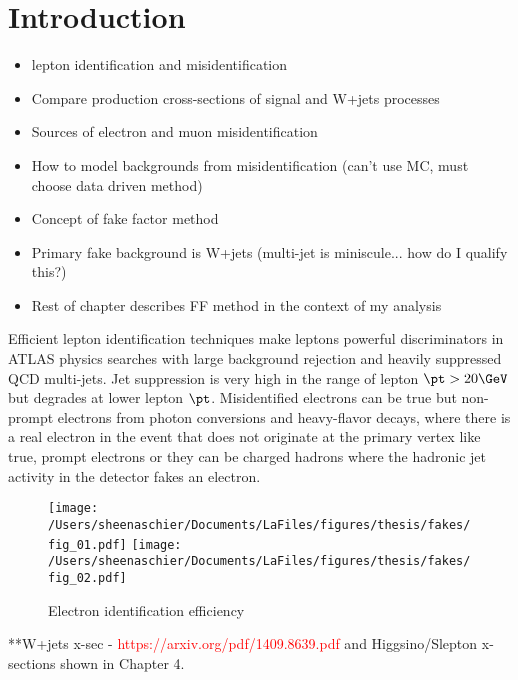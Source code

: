 \section{Introduction}
\label{sec:FFintro}
\begin{itemize}
\item lepton identification and misidentification
\item Compare production cross-sections of signal and W+jets processes
\item Sources of electron and muon misidentification
\item How to model backgrounds from misidentification (can't use MC, must choose data driven method)
\item Concept of fake factor method
\item Primary fake background is W+jets (multi-jet is miniscule...  how do I qualify this?)
\item Rest of chapter describes FF method in the context of my analysis
\end{itemize}
Efficient lepton identification techniques make leptons powerful discriminators in ATLAS physics searches with large background rejection and heavily suppressed QCD multi-jets.  Jet suppression is very high in the range of lepton $\pt > 20\GeV$ but degrades at lower lepton $\pt$.  Misidentified electrons can be true but non-prompt electrons from photon conversions and heavy-flavor decays, where there is a real electron in the event that does not originate at the primary vertex like true, prompt electrons or they can be charged hadrons where the  hadronic jet activity in the detector fakes an electron.  
\begin{figure}[h!]
 \centering
 \texttt{[image: /Users/sheenaschier/Documents/LaFiles/figures/thesis/fakes/fig\_01.pdf]}
  \texttt{[image: /Users/sheenaschier/Documents/LaFiles/figures/thesis/fakes/fig\_02.pdf]}
 \caption{Electron identification efficiency}
 \label{fig:electronID}
 \end{figure}

**W+jets x-sec - \textcolor{red}{https://arxiv.org/pdf/1409.8639.pdf} and Higgsino/Slepton x-sections shown in Chapter 4.
 \FloatBarrier
 
